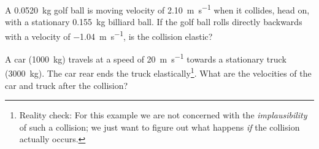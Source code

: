 \begin{example}
  A \SI{.0520}{\kilo\gram} golf ball is moving velocity of
  \SI{2.10}{\metre\per\second} when it collides, head on, with a stationary
  \SI{.155}{\kilo\gram} billiard  ball. If the golf ball rolls directly
  backwards with a velocity of \SI{-1.04}{\metre\per\second}, is the collision
  elastic?
\end{example}


\begin{example}
  A car (\SI{1000}{\kilo\gram}) travels at a speed of
  \SI{20}{\metre\per\second} towards a stationary truck
  (\SI{3000}{\kilo\gram}). The car rear ends the truck
  elastically\footnote{Reality check: For this example we are not concerned
  with the \emph{implausibility} of such a collision; we just want to figure
  out what happens \emph{if} the collision actually occurs.}. What are the
  velocities of the car and truck after the collision?
\end{example}
%
%
%
%
%
%
%
%
%
%
